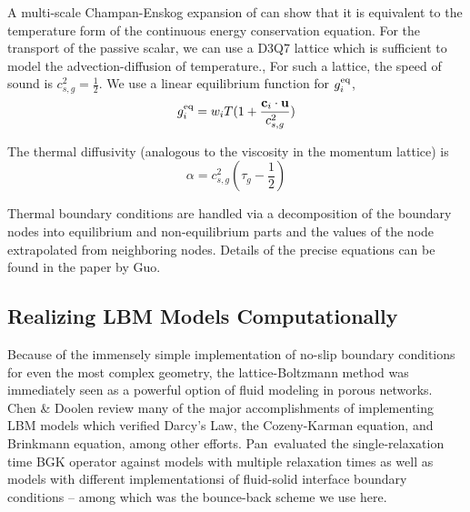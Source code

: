 A multi-scale Champan-Enskog expansion of  can show that it is equivalent to the temperature form of the continuous energy conservation equation.\cite{Guo2002} For the transport of the passive scalar, we can use a D3Q7 lattice which is sufficient to model the advection-diffusion of temperature.\cite{Latt2007,Parmigiani2011}, For such a lattice, the speed of sound is $c^2_{s,g} = \frac{1}{2}$. We use a linear equilibrium function for $g_i^{\text{eq}}$,
\begin{equation}
	g_i^{\text{eq}} = w_i T (1+\frac{\mathbf{c}_i\cdot\mathbf{u}}{c_{s,g}^2})
\end{equation}

The thermal diffusivity (analogous to the viscosity in the momentum lattice) is 
\begin{equation}
	\alpha = c_{s,g}^2(\tau_{g} - \frac{1}{2})
\end{equation}

Thermal boundary conditions are handled via a decomposition of the boundary nodes into equilibrium and non-equilibrium parts and the values of the node extrapolated from neighboring nodes. Details of the precise equations can be found in the paper by Guo\etal.\cite{Guo2002}


\subsection{Realizing LBM Models Computationally}
Because of the immensely simple implementation of no-slip boundary conditions for even the most complex geometry, the lattice-Boltzmann method was immediately seen as a powerful option of fluid modeling in porous networks. Chen \& Doolen review many of the major accomplishments of implementing LBM models which verified Darcy's Law, the Cozeny-Karman equation, and Brinkmann equation, among other efforts.\cite{Chen1998a} Pan\etal~evaluated the single-relaxation time BGK operator against models with multiple relaxation times as well as models with different implementationsi of fluid-solid interface boundary conditions -- among which was the bounce-back scheme we use here.\cite{Pan2006}

